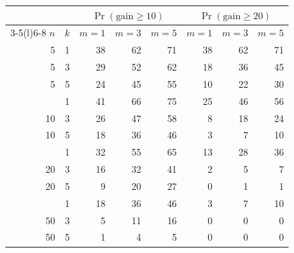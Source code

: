 \begin{tabular}{@{}rrrrrrrr@{}}
\toprule
 & & \multicolumn{3}{c}{$\Pr(\text{gain}\ge 10)$} & \multicolumn{3}{c}{$\Pr(\text{gain}\ge 20)$}\\
\cmidrule(lr){3-5}\cmidrule(l){6-8}
$n$ & $k$ & $m{=}1$ & $m{=}3$ & $m{=}5$ & $m{=}1$ & $m{=}3$ & $m{=}5$\\ \midrule
5 & 1 & 38 & 62 & 71 & 38 & 62 & 71\\
5 & 3 & 29 & 52 & 62 & 18 & 36 & 45\\
5 & 5 & 24 & 45 & 55 & 10 & 22 & 30\\
\addlinespace
10 & 1 & 41 & 66 & 75 & 25 & 46 & 56\\
10 & 3 & 26 & 47 & 58 & 8 & 18 & 24\\
10 & 5 & 18 & 36 & 46 & 3 & 7 & 10\\
\addlinespace
20 & 1 & 32 & 55 & 65 & 13 & 28 & 36\\
20 & 3 & 16 & 32 & 41 & 2 & 5 & 7\\
20 & 5 & 9 & 20 & 27 & 0 & 1 & 1\\
\addlinespace
50 & 1 & 18 & 36 & 46 & 3 & 7 & 10\\
50 & 3 & 5 & 11 & 16 & 0 & 0 & 0\\
50 & 5 & 1 & 4 & 5 & 0 & 0 & 0\\
\bottomrule
\end{tabular}
